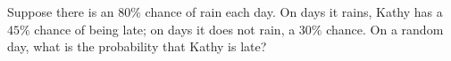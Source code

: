 Suppose there is an $80\%$ chance of rain each day. On days it rains, Kathy has a $45\%$ chance of being late; on days it does not rain, a $30\%$ chance. On a random day, what is the probability that Kathy is late?
